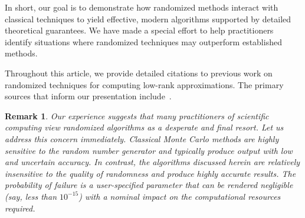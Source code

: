 \documentclass[final]{siamltex}
\newcounter{algorithm}[section]
\newtheorem{remark}{Remark}[section]
\begin{document}
In short, our goal is to demonstrate how randomized methods
interact with classical techniques to yield effective, modern
algorithms supported by detailed theoretical guarantees.
We have made a special effort to help practitioners identify
situations where randomized techniques may outperform established
methods.

Throughout this article, we provide detailed citations to previous work
on randomized techniques for computing low-rank approximations.
The primary sources that inform our presentation include~\cite{BMD09:Improved-Approximation,drineas_kannan_mahoney,kannan_vempala,%
random1,papadimitriou,tygert_szlam,2008_rokhlin_leastsquares,Sar06:Improved-Approximation,random2}.


%




\lsp

\begin{remark}
\label{remark:queasy} \rm Our experience suggests that many
practitioners of scientific computing view randomized algorithms as a
desperate and final resort.  Let us address this concern immediately.
Classical Monte Carlo methods are highly sensitive to the random
number generator and typically produce output with low and uncertain
accuracy.  In contrast, the algorithms discussed herein are relatively
insensitive
to the quality of randomness and produce highly accurate results.
The probability of failure is a user-specified parameter that can
be rendered negligible (say, less than $10^{-15}$) with a nominal
impact on the computational resources required.
\end{remark}
\end{document}
